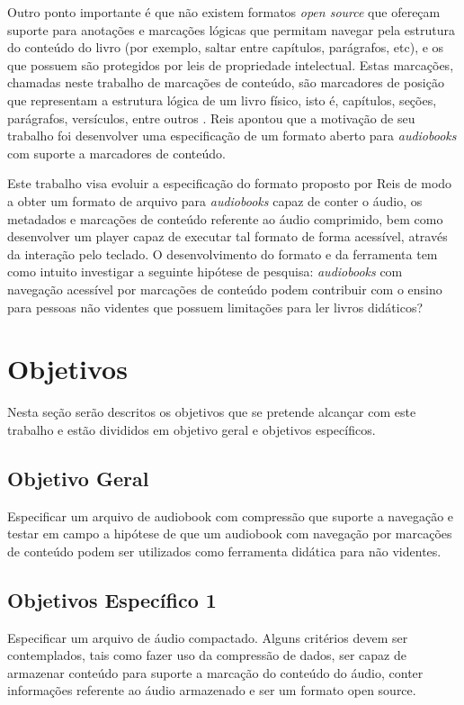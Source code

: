 Outro ponto importante é que não existem formatos \textit{open source} que ofereçam suporte para  anotações e marcações lógicas que permitam navegar pela estrutura do conteúdo do livro (por exemplo, saltar entre capítulos, parágrafos, etc), e os que possuem são protegidos por leis de propriedade intelectual. Estas marcações, chamadas neste trabalho de marcações de conteúdo, são marcadores de posição que representam a estrutura lógica de um livro físico, isto é, capítulos, seções, parágrafos, versículos, entre outros \cite{herbert}. Reis apontou que a motivação de seu trabalho foi desenvolver uma especificação de um formato aberto para \textit{audiobooks} com suporte a marcadores de conteúdo.

Este trabalho visa evoluir a especificação do formato proposto por Reis de modo a obter um formato de arquivo para \textit{audiobooks} capaz de conter o áudio, os metadados e marcações de conteúdo referente ao áudio comprimido, bem como desenvolver um player capaz de executar tal formato de forma acessível, através da interação pelo teclado. O desenvolvimento do formato e da ferramenta tem como intuito investigar a seguinte hipótese de pesquisa: \textit{audiobooks} com navegação acessível por marcações de conteúdo podem contribuir com o ensino para pessoas não videntes que possuem limitações para ler livros didáticos?

\section{Objetivos}

Nesta seção serão descritos os objetivos que se pretende alcançar com este trabalho e estão divididos em objetivo geral e objetivos específicos.

\subsection{Objetivo Geral}

Especificar um arquivo de audiobook com compressão que suporte a navegação e testar em campo a hipótese de que um audiobook com navegação por marcações de conteúdo podem ser utilizados como ferramenta didática para não videntes.

\subsection{Objetivos Específico 1}

Especificar um arquivo de áudio compactado. Alguns critérios devem ser contemplados, tais como fazer uso da compressão de dados, ser capaz de armazenar conteúdo para suporte a marcação do conteúdo do áudio, conter informações referente ao áudio armazenado e ser um formato open source.

